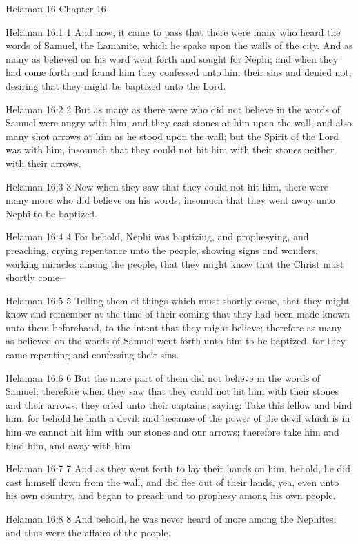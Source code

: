 Helaman 16
Chapter 16

Helaman 16:1
 1 And now, it came to pass that there were many who heard the
words of Samuel, the Lamanite, which he spake upon the walls of
the city. And as many as believed on his word went forth and
sought for Nephi; and when they had come forth and found him they
confessed unto him their sins and denied not, desiring that they
might be baptized unto the Lord.

Helaman 16:2
 2 But as many as there were who did not believe in the words of
Samuel were angry with him; and they cast stones at him upon the
wall, and also many shot arrows at him as he stood upon the wall;
but the Spirit of the Lord was with him, insomuch that they could
not hit him with their stones neither with their arrows.

Helaman 16:3
 3 Now when they saw that they could not hit him, there were many
more who did believe on his words, insomuch that they went away
unto Nephi to be baptized.

Helaman 16:4
 4 For behold, Nephi was baptizing, and prophesying, and
preaching, crying repentance unto the people, showing signs and
wonders, working miracles among the people, that they might know
that the Christ must shortly come--

Helaman 16:5
 5 Telling them of things which must shortly come, that they
might know and remember at the time of their coming that they had
been made known unto them beforehand, to the intent that they
might believe; therefore as many as believed on the words of
Samuel went forth unto him to be baptized, for they came
repenting and confessing their sins.

Helaman 16:6
 6 But the more part of them did not believe in the words of
Samuel; therefore when they saw that they could not hit him with
their stones and their arrows, they cried unto their captains,
saying: Take this fellow and bind him, for behold he hath a
devil; and because of the power of the devil which is in him we
cannot hit him with our stones and our arrows; therefore take him
and bind him, and away with him.

Helaman 16:7
 7 And as they went forth to lay their hands on him, behold, he
did cast himself down from the wall, and did flee out of their
lands, yea, even unto his own country, and began to preach and to
prophesy among his own people.

Helaman 16:8
 8 And behold, he was never heard of more among the Nephites; and
thus were the affairs of the people.


